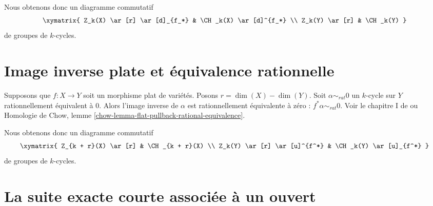 \medskip\noindent
Nous obtenons donc un diagramme commutatif
$$
\xymatrix{
Z_k(X) \ar[r] \ar[d]_{f_*} & \CH_k(X) \ar[d]^{f_*} \\
Z_k(Y) \ar[r] & \CH_k(Y)
}
$$
de groupes de $k$-cycles.


\section{Image inverse plate et équivalence rationnelle}
\label{section-flat-pullback-and-rational-equivalence}

\noindent
Supposons que $f : X \to Y$ soit un morphisme plat de variétés.
Posons $r = \dim(X) - \dim(Y)$.
Soit $\alpha \sim_{rat} 0$ un $k$-cycle sur
$Y$ rationnellement équivalent à $0$. Alors l'image inverse
de $\alpha$ est rationnellement équivalente à zéro :
$f^* \alpha \sim_{rat} 0$. Voir le chapitre I de \cite{F} ou
Homologie de Chow, lemme \ref{chow-lemma-flat-pullback-rational-equivalence}.

\medskip\noindent
Nous obtenons donc un diagramme commutatif
$$
\xymatrix{
Z_{k + r}(X) \ar[r] & \CH_{k + r}(X) \\
Z_k(Y) \ar[r] \ar[u]^{f^*} & \CH_k(Y) \ar[u]_{f^*}
}
$$
de groupes de $k$-cycles.


\section{La suite exacte courte associée à un ouvert}
\label{section-ses}

